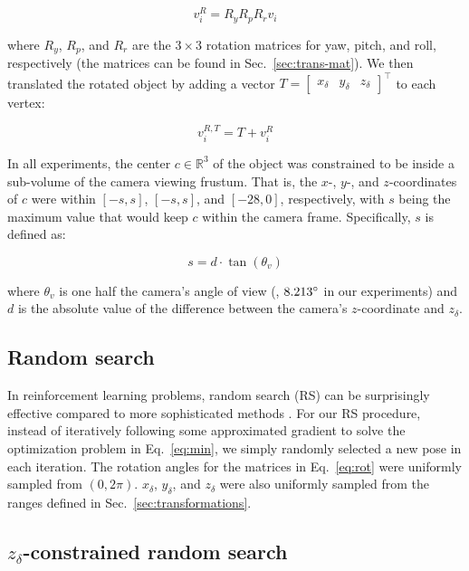 \documentclass[10pt,twocolumn,letterpaper]{article}
\newcommand{\R}{\mathbb{R}}
\begin{document}
\begin{equation}
\label{eq:rot}
v_{i}^{R} = R_{y}R_{p}R_{r}v_{i}
\end{equation}

\noindent
where $R_{y}$, $R_{p}$, and $R_{r}$ are the $3\times 3$ rotation matrices for yaw, pitch, and roll, respectively (the matrices can be found in Sec.~\ref{sec:trans-mat}).
We then translated the rotated object by adding a vector $T = \begin{bmatrix} x_{\delta} & y_{\delta} & z_{\delta} \end{bmatrix}^\top$ to each vertex:

\begin{equation}
v_{i}^{R,T} = T + v_{i}^{R}
\end{equation}

In all experiments, the center $c \in \R^3$ of the object was constrained to be inside a sub-volume of the camera viewing frustum.
That is, the $x$-, $y$-, and $z$-coordinates of $c$ were within $[-s,s]$, $[-s,s]$, and $[-28,0]$, respectively, with $s$ being the maximum value that would keep $c$ within the camera frame.
Specifically, $s$ is defined as:

\begin{equation} \label{eq:max_trans}
s = d \cdot\tan(\theta_{v})
\end{equation}

\noindent
where $\theta_{v}$ is one half the camera's angle of view (\ie, $8.213\degree$ in our experiments) and $d$ is the absolute value of the difference between the camera's $z$-coordinate and $z_{\delta}$.




\subsection{Random search}
\label{sec:random_search}

In reinforcement learning problems, random search (RS) can be surprisingly effective compared to more sophisticated methods \cite{such2017deep}.
For our RS procedure, instead of iteratively following some approximated gradient to solve the optimization problem in Eq.~\ref{eq:min}, we simply randomly selected a new pose in each iteration.
The rotation angles for the matrices in Eq.~\ref{eq:rot} were uniformly sampled from $(0, 2\pi)$.
$x_{\delta}$, $y_{\delta}$, and $z_{\delta}$ were also uniformly sampled from the ranges defined in Sec.~\ref{sec:transformations}.

\subsection{$z_{\delta}$-constrained random search}
\end{document}
